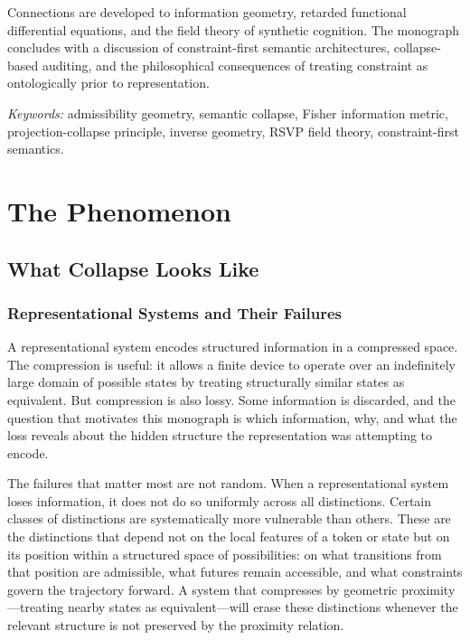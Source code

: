 \documentclass[12pt, oneside]{book}
\theoremstyle{plain-flyxion}
\theoremstyle{definition-flyxion}
\begin{document}
Connections are developed to information geometry, retarded functional differential
equations, and the field theory of synthetic cognition. The monograph concludes with a
discussion of constraint-first semantic architectures, collapse-based auditing, and the
philosophical consequences of treating constraint as ontologically prior to representation.

\vspace{1em}
\noindent\textit{Keywords:} admissibility geometry, semantic collapse, Fisher information
metric, projection-collapse principle, inverse geometry, RSVP field theory,
constraint-first semantics.

\tableofcontents

\mainmatter

\part{The Phenomenon}

\chapter{What Collapse Looks Like}

\section{Representational Systems and Their Failures}

A representational system encodes structured information in a compressed space. The
compression is useful: it allows a finite device to operate over an indefinitely large
domain of possible states by treating structurally similar states as equivalent. But
compression is also lossy. Some information is discarded, and the question that motivates
this monograph is which information, why, and what the loss reveals about the hidden
structure the representation was attempting to encode.

The failures that matter most are not random. When a representational system loses
information, it does not do so uniformly across all distinctions. Certain classes of
distinctions are systematically more vulnerable than others. These are the distinctions
that depend not on the local features of a token or state but on its position within a
structured space of possibilities: on what transitions from that position are admissible,
what futures remain accessible, and what constraints govern the trajectory forward. A
system that compresses by geometric proximity---treating nearby states as equivalent---will
erase these distinctions whenever the relevant structure is not preserved by the proximity
relation.
\end{document}
